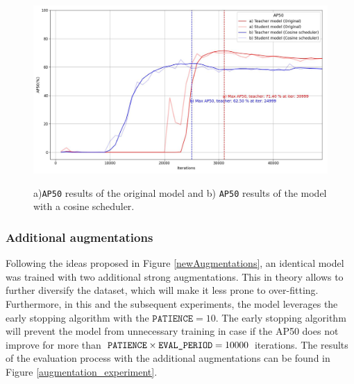 \begin{figure}[htb]
	\begin{center}
		\includegraphics[width=14cm]{./AP50_scheduler.jpg}
	\end{center}
	\caption{a)\texttt{AP50} results of the original model and b) \texttt{AP50} results of the model with a cosine scheduler.}
	\begin{center}
		\label{comparison_1}
	\end{center}
\end{figure}
\FloatBarrier

\subsubsection{Additional augmentations}
\label{augmentations_section} 
Following the ideas proposed in Figure \ref{newAugmentations}, an identical model was trained with two additional strong augmentations. This in theory allows to further diversify the dataset, which will make it less prone to over-fitting. Furthermore, in this and the subsequent  experiments, the model leverages the early stopping algorithm with the $\texttt{PATIENCE} = 10$. The early stopping algorithm will prevent the model from unnecessary training in case if the AP50 does not improve for more than $\texttt{PATIENCE} \times \texttt{EVAL\textunderscore PERIOD} = 10 000$ iterations. The results of the evaluation process with the additional augmentations can be found in Figure \ref{augmentation_experiment}. 
 
